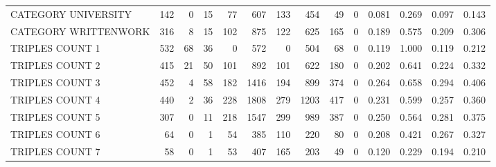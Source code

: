 \begin{tabular}{lrrrrrrrrrllll}
 CATEGORY UNIVERSITY      &             142 &             0 &              15 &              77 &             607 &  133 &  454 &   49 &    0 & 0.081 & 0.269 & 0.097 & 0.143 \\
 CATEGORY WRITTENWORK     &             316 &             8 &              15 &             102 &             875 &  122 &  625 &  165 &    0 & 0.189 & 0.575 & 0.209 & 0.306 \\
 TRIPLES COUNT 1          &             532 &            68 &              36 &               0 &             572 &    0 &  504 &   68 &    0 & 0.119 & 1.000 & 0.119 & 0.212 \\
 TRIPLES COUNT 2          &             415 &            21 &              50 &             101 &             892 &  101 &  622 &  180 &    0 & 0.202 & 0.641 & 0.224 & 0.332 \\
 TRIPLES COUNT 3          &             452 &             4 &              58 &             182 &            1416 &  194 &  899 &  374 &    0 & 0.264 & 0.658 & 0.294 & 0.406 \\
 TRIPLES COUNT 4          &             440 &             2 &              36 &             228 &            1808 &  279 & 1203 &  417 &    0 & 0.231 & 0.599 & 0.257 & 0.360 \\
 TRIPLES COUNT 5          &             307 &             0 &              11 &             218 &            1547 &  299 &  989 &  387 &    0 & 0.250 & 0.564 & 0.281 & 0.375 \\
 TRIPLES COUNT 6          &              64 &             0 &               1 &              54 &             385 &  110 &  220 &   80 &    0 & 0.208 & 0.421 & 0.267 & 0.327 \\
 TRIPLES COUNT 7          &              58 &             0 &               1 &              53 &             407 &  165 &  203 &   49 &    0 & 0.120 & 0.229 & 0.194 & 0.210 \\
\hline
\end{tabular}